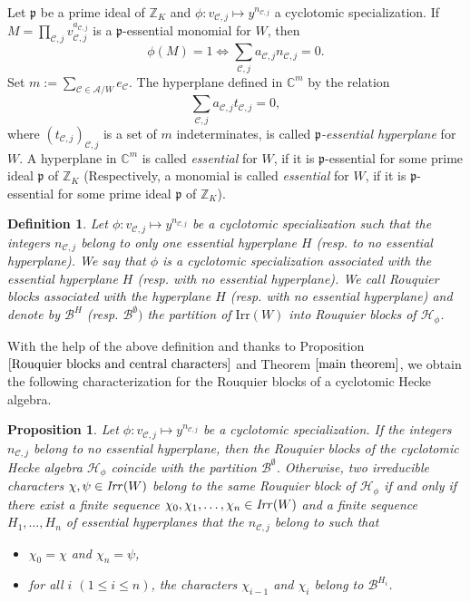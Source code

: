 \documentclass[10pt,a4paper,titlepage]{article}
\newtheorem{definition}[theorem]{Definition}
\newtheorem{proposition}[theorem]{Proposition}
\begin{document}
Let $\mathfrak{p}$ be a prime ideal of $\mathbb{Z}_K$ and  $\phi: v_{\mathcal{C},j} \mapsto y^{n_{\mathcal{C},j}}$ a cyclotomic specialization.
If $M=\prod_{\mathcal{C},j}v_{\mathcal{C},j}^{a_{\mathcal{C},j}}$
is a $\mathfrak{p}$-essential monomial for $W$, then
$$\phi(M)=1 \Leftrightarrow \sum_{\mathcal{C},j}a_{\mathcal{C},j}n_{\mathcal{C},j}=0.$$
Set $m:=\sum_{\mathcal{C}\in \mathcal{A}/W}e_\mathcal{C}$. The
hyperplane defined in $\mathbb{C}^m$ by the relation
$$\sum_{\mathcal{C},j}a_{\mathcal{C},j}t_{\mathcal{C},j}=0,$$ where
$(t_ {\mathcal{C},j})_{ \mathcal{C},j}$ is a set of $m$
indeterminates, is called \emph{$\mathfrak{p}$-essential hyperplane}
for $W$. A hyperplane in $\mathbb{C}^m$ is called \emph{essential}
for $W$, if it is $\mathfrak{p}$-essential for some prime ideal
$\mathfrak{p}$ of $\mathbb{Z}_K$ (Respectively, a monomial is called \emph{essential}
for $W$, if it is $\mathfrak{p}$-essential for some prime ideal
$\mathfrak{p}$ of $\mathbb{Z}_K$).

\begin{definition}\label{assoc with hyp}Let
$\phi: v_{\mathcal{C},j} \mapsto y^{n_{\mathcal{C},j}}$ be a cyclotomic specialization  such that  the integers
$n_{\mathcal{C},j}$ belong to only one essential hyperplane $H$ (resp. to no essential hyperplane). We say that $\phi$ is a cyclotomic specialization associated with the essential hyperplane $H$ (resp. with no essential hyperplane). We call Rouquier blocks associated with the hyperplane
$H$ (resp. with no essential hyperplane) and denote by  $\mathcal{B}^H$ (resp. $\mathcal{B}^\emptyset)$ the partition of $\mathrm{Irr}(W)$ into Rouquier blocks of $\mathcal{H}_\phi$.
\end{definition}

With the help of the above definition and thanks to Proposition $\ref{Rouquier blocks and central characters}$ and Theorem $\ref{main theorem}$, we obtain the following characterization for the Rouquier blocks of a cyclotomic Hecke algebra.

\begin{proposition}\label{explain AllBlocks}
Let  $\phi: v_{\mathcal{C},j} \mapsto y^{n_{\mathcal{C},j}}$ be a cyclotomic specialization. If the integers
 $n_{\mathcal{C},j}$ belong to no essential hyperplane, then 
the Rouquier blocks of the cyclotomic Hecke algebra $\mathcal{H}_\phi$ coincide with the partition  $\mathcal{B}^\emptyset$.
Otherwise, two irreducible characters $\chi, \psi \in \textrm{\emph{Irr}}(W)$ belong to the same Rouquier block of  $\mathcal{H}_\phi$ if
and only if there exist a finite sequence
$\chi_0,\chi_1,\ldots,\chi_n \in \textrm{\emph{Irr}}(W)$ and a
finite sequence $H_1,\ldots,H_n$ of essential hyperplanes that the $n_{\mathcal{C},j}$ belong to such that
\begin{itemize}
  \item $\chi_0=\chi$ and $\chi_n=\psi$,
  \item for all $i$ $(1\leq i \leq n)$,  the characters $\chi_{i-1}$ and $\chi_i$ belong to $\mathcal{B}^{H_i}$.
\end{itemize}
 \end{proposition}
\end{document}

